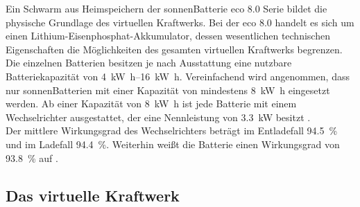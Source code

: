 Ein Schwarm aus Heimspeichern der sonnenBatterie eco 8.0 Serie bildet die physische Grundlage des virtuellen Kraftwerks. Bei der eco 8.0 handelt es sich um einen Lithium-Eisenphosphat-Akkumulator, dessen wesentlichen technischen Eigenschaften die Möglichkeiten des gesamten virtuellen Kraftwerks begrenzen.\\
Die einzelnen Batterien besitzen je nach Ausstattung eine nutzbare Batteriekapazität von \SIrange{4}{16}{\kilo\watt\hour}. Vereinfachend wird angenommen, dass nur sonnenBatterien mit einer Kapazität von mindestens \SI{8}{\kilo\watt\hour} eingesetzt werden. Ab einer Kapazität von  \SI{8}{\kilo\watt\hour} ist jede Batterie  mit einem Wechselrichter ausgestattet, der eine Nennleistung von \SI{3.3}{\kilo\watt} besitzt \parencite{sonnenBat18}.\\
Der mittlere Wirkungsgrad des Wechselrichters beträgt im Entladefall \SI{94.5}{\percent} und im Ladefall \SI{94.4}{\percent}. Weiterhin weißt die Batterie einen Wirkungsgrad von \SI{93.8}{\percent} auf \parencite{htwInspek19}.

\subsection{Das virtuelle Kraftwerk}\label{sec:VK_Theorie}

